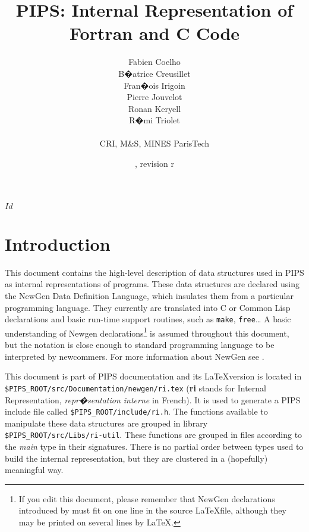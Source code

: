 \documentclass[a4paper]{article}
\title{PIPS: Internal Representation of Fortran and C Code}
\author{Fabien Coelho\\
  B�atrice Creusillet\\
  Fran�ois Irigoin \\
  Pierre Jouvelot \\
  Ronan Keryell \\
  R�mi Triolet\\
  \\
  CRI, M\&S, MINES ParisTech}
\date{\svnInfoLongDate{}, revision r\svnInfoRevision}
\begin{document}
\svnInfo $Id$
\maketitle
\sloppy
\newpage
\tableofcontents
\newpage
\section*{Introduction}

This document contains the high-level description of data structures
used in PIPS as internal representations of programs. These data
structures are declared using the NewGen Data Definition Language,
which insulates them from a particular programming language. They
currently are translated into C or Common Lisp declarations and basic
run-time support routines, such as \texttt{make}, \texttt{free}\ldots
A basic understanding of Newgen declarations\footnote{If you edit this
  document, please remember that NewGen declarations introduced by
  \expandafter\texttt{\string\domain} must fit on one line in the source
  \LaTeX file, although they may be printed on several lines by \LaTeX.} is
assumed throughout this document, but the notation is close enough to
standard programming language to be interpreted by newcommers. For
more information about NewGen see \cite{JT89,JT90}.

This document is part of PIPS documentation and its \LaTeX version is
located in \verb+$PIPS_ROOT/src/Documentation/newgen/ri.tex+
(\textbf{ri} stands for Internal Representation, 
\emph{repr�sentation interne} in French). 
It is used to generate a PIPS include file called 
\verb+$PIPS_ROOT/include/ri.h+. The functions available to manipulate
these data structures are grouped in library
\verb+$PIPS_ROOT/src/Libs/ri-util+. These functions are grouped in files
according to the \emph{main} type in their signatures. 
There is no partial order between types used to build the internal 
representation, but they are clustered in a (hopefully) meaningful way.


\begin{comment}
Ce document est utilis� directement et automatiquement par l'outil
de g�nie logiciel NewGen pour g�n�rer les d�clarations des structures
de donn�es utilis�es dans le projet PIPS, ainsi que les routines de
base qui les manipulent. C'est pourquoi l'ordre des sections n'est pas
n�cessairement naturel.
\end{comment}
\end{document}
